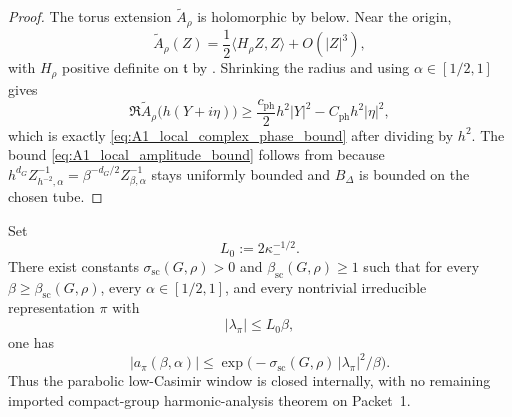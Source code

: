 \begin{proof}
The torus extension $\widetilde A_\rho$ is holomorphic by  below.
Near the origin,
\[
\widetilde A_\rho(Z)=\frac12\langle H_\rho Z,Z\rangle+O(|Z|^3),
\]
with $H_\rho$ positive definite on $\mathfrak t$ by .
Shrinking the radius and using $\alpha\in[1/2,1]$ gives
\[
\Re\widetilde A_\rho\bigl(h(Y+i\eta)\bigr)
\ge
\frac{c_{\mathrm{ph}}}{2}h^2|Y|^2-C_{\mathrm{ph}}h^2|\eta|^2,
\]
which is exactly \eqref{eq:A1_local_complex_phase_bound} after dividing by $h^2$.
The bound \eqref{eq:A1_local_amplitude_bound} follows from  because
$h^{d_G}Z_{h^{-2},\alpha}^{-1}=\beta^{-d_G/2}Z_{\beta,\alpha}^{-1}$ stays uniformly bounded and $B_\Delta$ is bounded on the chosen tube.
\end{proof}

\begin{theorem}\label{thm:A1_compact_group_semiclassical_multiplier_exact}
Set
\[
L_0:=2\kappa_-^{-1/2}.
\]
There exist constants $\sigma_{\mathrm{sc}}(G,\rho)>0$ and $\beta_{\mathrm{sc}}(G,\rho)\ge 1$ such that for every $\beta\ge \beta_{\mathrm{sc}}(G,\rho)$, every $\alpha\in[1/2,1]$, and every nontrivial irreducible representation $\pi$ with
\begin{equation}\label{eq:A1_sc_multiplier_window}
|\lambda_\pi|\le L_0\beta,
\end{equation}
one has
\begin{equation}\label{eq:A1_sc_multiplier_exact}
|a_\pi(\beta,\alpha)|
\le
\exp\!\bigl(-\sigma_{\mathrm{sc}}(G,\rho)\,|\lambda_\pi|^2/\beta\bigr).
\end{equation}
Thus the parabolic low-Casimir window is closed internally, with no remaining imported compact-group harmonic-analysis theorem on Packet~1.
\end{theorem}

